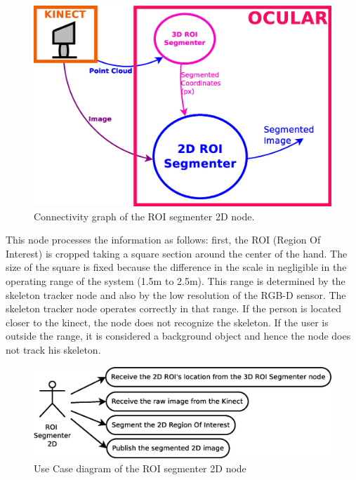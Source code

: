 		\begin{figure}[H]
			\begin{center}
			\includegraphics[width=0.5\linewidth]{img/diagrams/node_roi2d.eps}
			\caption[ROI segmenter 2D node I/O]{Connectivity graph of the ROI segmenter 2D node.}		
			\label{node_roi2d}
			\end{center}
		\end{figure}

	This node processes the information as follows: first, the ROI (Region Of Interest) is cropped taking a square section around the center of the hand. 
	The size of the square is fixed because the difference in the scale in negligible in the operating range of the system (1.5m to 2.5m). 
	This range is determined by the skeleton tracker node and also by the low resolution of the RGB-D sensor. 
	The skeleton tracker node operates correctly in that range. 
	If the person is located closer to the kinect, the node does not recognize the skeleton. 
	If the user is outside the range, it is considered a background object and hence the node does not track his skeleton. 
	\\
	\begin{figure}[H]
		\centering
			\includegraphics[scale=0.4]{img/diagrams/uc_roi_segmenter_2d.eps}
			\caption[Use case diagram ROI segmenter 2D node]{Use Case diagram of the ROI segmenter 2D node}
		\label{uc_roi2d}
	\end{figure}

